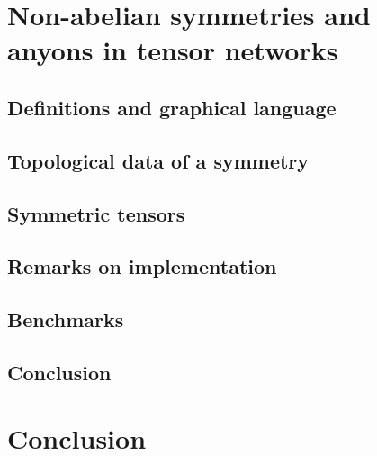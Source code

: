 \documentclass[12pt,a4paper]{book}
\begin{document}
\chapter[Non-abelian symmetries]{%
    Non-abelian symmetries and anyons in tensor networks
}
\label{ch:nonabelian}


\section{Definitions and graphical language}
\label{sec:nonabelian:basics}


\section{Topological data of a symmetry}
\label{sec:nonabelian:topo_data}


\section{Symmetric tensors}
\label{sec:nonabelian:symmetric_tensors}


\section{Remarks on implementation}
\label{sec:nonabelian:tenpy_v2}


\section{Benchmarks}
\label{sec:nonabelian:benchmarks}


\section{Conclusion}
\label{sec:nonabelian:conclusion}


\chapter{Conclusion}
\label{ch:conclusion}

\end{document}
